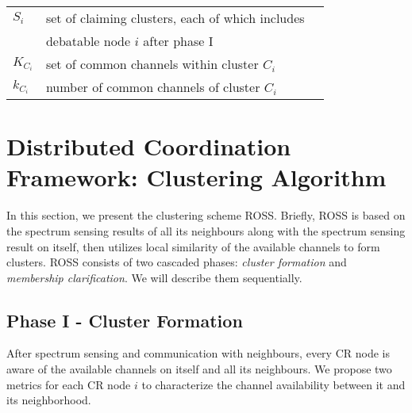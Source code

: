 \documentclass[journal,comsoc]{IEEEtran}
\theoremstyle{mytheoremstyle}
\theoremstyle{mytheoremstyle}
\theoremstyle{mytheoremstyle}
\begin{document}
\begin{table}[h!]
\begin{tabular}{llr}
$S_i$ & set of claiming clusters, each of which includes \\
& debatable node $i$ after phase I\\
$K_{C_i}$ & set of common channels within cluster $C_i$\\
$k_{C_i}$ & number of common channels of cluster $C_i$\\
\bottomrule
\end{tabular}
\end{table}





\section{Distributed Coordination Framework: Clustering Algorithm}
\label{ross}



In this section, we present the clustering scheme ROSS.
Briefly, ROSS is based on the spectrum sensing results of all its neighbours along with the spectrum sensing result on itself, then utilizes local similarity of the available channels to form clusters.
ROSS consists of two cascaded phases: \textit{cluster formation} and \textit{membership clarification}.
We will describe them sequentially.

\subsection{Phase I - Cluster Formation}
\label{phaseI}
After spectrum sensing and communication with neighbours, every CR node is aware of the available channels on itself and all its neighbours.
We propose two metrics for each CR node $i$ to characterize the channel availability between it and its neighborhood.
\end{document}
